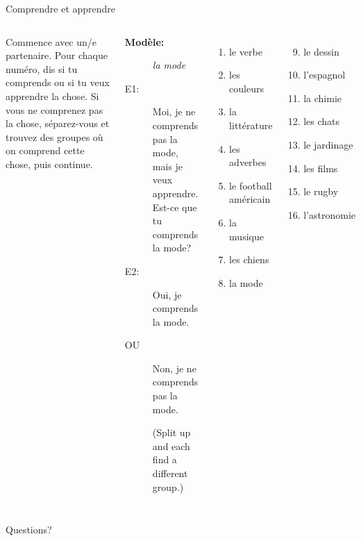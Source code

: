 \documentclass{beamer}
\begin{document}
  \begin{frame}{Comprendre et apprendre}
    \begin{columns}[t]
        {\small
        Commence avec un/e partenaire.
        Pour chaque numéro, dis si tu \alert{comprends} ou si tu veux \alert{apprendre} la chose.
        Si vous ne comprenez pas la chose, séparez-vous et trouvez des groupes où on comprend cette chose, puis continue.} \\
        \scriptsize
        \begin{description}
          \item[\textbf{Modèle:}] \emph{la mode}
          \item[E1:] Moi, je ne comprends pas la mode, mais je veux apprendre. Est-ce que tu comprends la mode?
          \item[E2:] Oui, je comprends la mode.
          \item[OU] Non, je ne comprends pas la mode.
          \item[] {\tiny (Split up and each find a different group.)}
        \end{description}
        \begin{columns}[t]
            \begin{enumerate}
              \item le verbe 
              \item les couleurs
              \item la littérature
              \item les adverbes
              \item le football américain
              \item la musique
              \item les chiens
              \item la mode
            \end{enumerate}
            \begin{enumerate}
              \setcounter{enumi}{8}
              \item le dessin
              \item l'espagnol
              \item la chimie
              \item les chats
              \item le jardinage
              \item les films
              \item le rugby
              \item l'astronomie
            \end{enumerate}
        \end{columns}
    \end{columns}
  \end{frame}

  \begin{frame}{}
    \begin{center}
      \Large Questions?
    \end{center}
  \end{frame}
\end{document}
